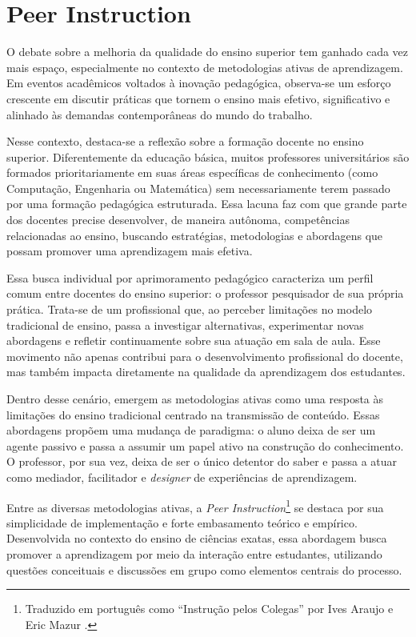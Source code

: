 \chapter{Peer Instruction}

O debate sobre a melhoria da qualidade do ensino superior tem ganhado cada vez mais espaço, especialmente no contexto de metodologias ativas de aprendizagem. Em eventos acadêmicos voltados à inovação pedagógica, observa-se um esforço crescente em discutir práticas que tornem o ensino mais efetivo, significativo e alinhado às demandas contemporâneas do mundo do trabalho.

Nesse contexto, destaca-se a reflexão sobre a formação docente no ensino superior. Diferentemente da educação básica, muitos professores universitários são formados prioritariamente em suas áreas específicas de conhecimento (como Computação, Engenharia ou Matemática) sem necessariamente terem passado por uma formação pedagógica estruturada. Essa lacuna faz com que grande parte dos docentes precise desenvolver, de maneira autônoma, competências relacionadas ao ensino, buscando estratégias, metodologias e abordagens que possam promover uma aprendizagem mais efetiva.

Essa busca individual por aprimoramento pedagógico caracteriza um perfil comum entre docentes do ensino superior: o professor pesquisador de sua própria prática. Trata-se de um profissional que, ao perceber limitações no modelo tradicional de ensino, passa a investigar alternativas, experimentar novas abordagens e refletir continuamente sobre sua atuação em sala de aula. Esse movimento não apenas contribui para o desenvolvimento profissional do docente, mas também impacta diretamente na qualidade da aprendizagem dos estudantes.

Dentro desse cenário, emergem as metodologias ativas como uma resposta às limitações do ensino tradicional centrado na transmissão de conteúdo. Essas abordagens propõem uma mudança de paradigma: o aluno deixa de ser um agente passivo e passa a assumir um papel ativo na construção do conhecimento. O professor, por sua vez, deixa de ser o único detentor do saber e passa a atuar como mediador, facilitador e {\it designer} de experiências de aprendizagem.

Entre as diversas metodologias ativas, a \textit{Peer Instruction}\footnote{Traduzido em português como ``Instrução pelos Colegas'' por Ives Araujo e Eric Mazur \cite{araujo:2013}.} se destaca por sua simplicidade de implementação e forte embasamento teórico e empírico. Desenvolvida no contexto do ensino de ciências exatas, essa abordagem busca promover a aprendizagem por meio da interação entre estudantes, utilizando questões conceituais e discussões em grupo como elementos centrais do processo.

